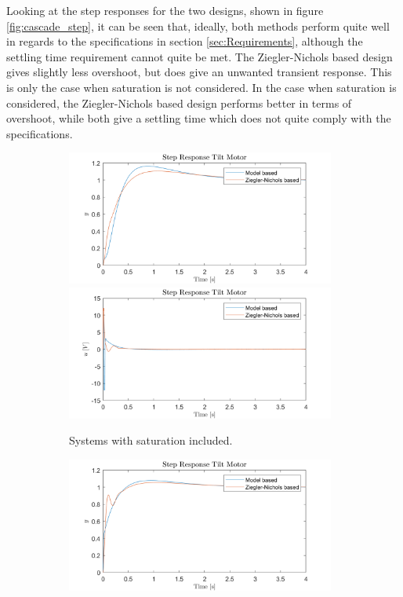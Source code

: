 \documentclass[../../main.tex]{subfiles}
\begin{document}
Looking at the step responses for the two designs, shown in figure \ref{fig:cascade_step}, it can be seen that, ideally, both methods perform quite well in regards to the specifications in section \ref{sec:Requirements}, although the settling time requirement cannot quite be met. The Ziegler-Nichols based design gives slightly less overshoot, but does give an unwanted transient response. This is only the case when saturation is not considered. In the case when saturation is considered, the Ziegler-Nichols based design performs better in terms of overshoot, while both give a settling time which does not quite comply with the specifications.

\begin{figure}[h]
\begin{subfigure}{0.48\textwidth}
    \includegraphics[width = 0.97\textwidth]{Sections/System_Design/Images/cascade_step_y_sat.png}
    \includegraphics[width = 0.97\textwidth]{Sections/System_Design/Images/cascade_step_u_sat.png}
    \caption{Systems with saturation included.}
    \label{fig:cascade_step_PP}
\end{subfigure}\quad
\begin{subfigure}{0.48\textwidth}
    \includegraphics[width = 0.97\textwidth]{Sections/System_Design/Images/cascade_step_y_NoSat.png}

\end{subfigure}
\end{figure}
\end{document}
